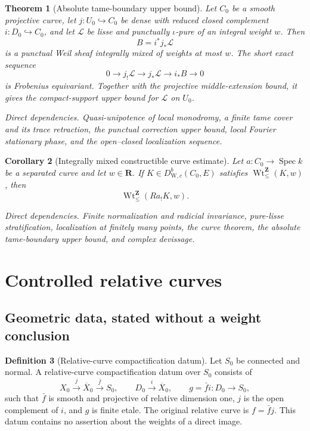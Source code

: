 \documentclass[10pt]{article}
\newtheorem{theorem}{Theorem}[section]
\newtheorem{corollary}[theorem]{Corollary}
\theoremstyle{definition}
\newtheorem{definition}[theorem]{Definition}
\newcommand{\DW}{D^b_{\mathrm W,c}}
\newcommand{\IntWtLe}{\operatorname{Wt}^{\mathbf Z}_{\leq}}
\newcommand{\Spec}{\operatorname{Spec}}
\newcommand{\dep}[1]{\par\smallskip\noindent\textit{Direct dependencies.} #1\par}
\begin{document}
\begin{theorem}[Absolute tame-boundary upper bound]
Let \(C_0\) be a smooth projective curve, let
\(j:U_0\hookrightarrow C_0\) be dense with reduced closed complement
\(i:D_0\hookrightarrow C_0\), and let \(\mathcal L\) be lisse and
punctually \(\iota\)-pure of an integral weight \(w\).  Then
\[
                         B=i^*j_*\mathcal L
\]
is a punctual Weil sheaf integrally mixed of weights at most \(w\).  The
short exact sequence
\[
 0\longrightarrow j_!\mathcal L\longrightarrow j_*\mathcal L
   \longrightarrow i_*B\longrightarrow0
\]
is Frobenius equivariant.  Together with the projective middle-extension
bound, it gives the compact-support upper bound for \(\mathcal L\) on
\(U_0\).
\dep{Quasi-unipotence of local monodromy, a finite tame cover and its trace
retraction, the punctual correction upper bound, local Fourier stationary
phase, and the open--closed localization sequence.}
\end{theorem}

\begin{corollary}[Integrally mixed constructible curve estimate]
Let \(a:C_0\to\Spec k\) be a separated curve and let
\(w\in\mathbf R\).  If \(K\in\DW(C_0,E)\) satisfies
\(\IntWtLe(K,w)\), then
\[
                         \IntWtLe(Ra_!K,w).
\]
\dep{Finite normalization and radicial invariance, pure-lisse
stratification, localization at finitely many points, the curve theorem,
the absolute tame-boundary upper bound, and complex devissage.}
\end{corollary}

\section{Controlled relative curves}

\subsection{Geometric data, stated without a weight conclusion}

\begin{definition}[Relative-curve compactification datum]
Let \(S_0\) be connected and normal.  A relative-curve compactification
datum over \(S_0\) consists of
\[
 X_0\xrightarrow{j}\overline X_0\xrightarrow{\bar f}S_0,
 \qquad D_0\xrightarrow{i}\overline X_0,
 \qquad g=\bar f i:D_0\to S_0,
\]
such that \(\bar f\) is smooth and projective of relative dimension one,
\(j\) is the open complement of \(i\), and \(g\) is finite etale.  The
original relative curve is \(f=\bar f j\).  This datum contains no assertion
about the weights of a direct image.
\end{definition}
\end{document}
